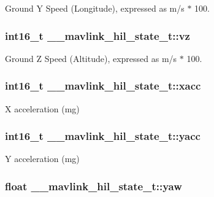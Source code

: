 Ground Y Speed (Longitude), expressed as m/s $\ast$ 100. 

\hypertarget{struct____mavlink__hil__state__t_add6c834de56047ff2316d059b741cce0}{
\subsubsection[{vz}]{\setlength{\rightskip}{0pt plus 5cm}int16\+\_\+t \+\_\+\+\_\+mavlink\+\_\+hil\+\_\+state\+\_\+t\+::vz}}\label{struct____mavlink__hil__state__t_add6c834de56047ff2316d059b741cce0}


Ground Z Speed (Altitude), expressed as m/s $\ast$ 100. 

\hypertarget{struct____mavlink__hil__state__t_a8497c1e566b9acb1d4298090c480a212}{
\subsubsection[{xacc}]{\setlength{\rightskip}{0pt plus 5cm}int16\+\_\+t \+\_\+\+\_\+mavlink\+\_\+hil\+\_\+state\+\_\+t\+::xacc}}\label{struct____mavlink__hil__state__t_a8497c1e566b9acb1d4298090c480a212}


X acceleration (mg) 

\hypertarget{struct____mavlink__hil__state__t_a670623660d6d3d15121b2698082e8f55}{
\subsubsection[{yacc}]{\setlength{\rightskip}{0pt plus 5cm}int16\+\_\+t \+\_\+\+\_\+mavlink\+\_\+hil\+\_\+state\+\_\+t\+::yacc}}\label{struct____mavlink__hil__state__t_a670623660d6d3d15121b2698082e8f55}


Y acceleration (mg) 

\hypertarget{struct____mavlink__hil__state__t_aa7a7dfae39434c0c51492cb2d5614863}{
\subsubsection[{yaw}]{\setlength{\rightskip}{0pt plus 5cm}float \+\_\+\+\_\+mavlink\+\_\+hil\+\_\+state\+\_\+t\+::yaw}}\label{struct____mavlink__hil__state__t_aa7a7dfae39434c0c51492cb2d5614863}



